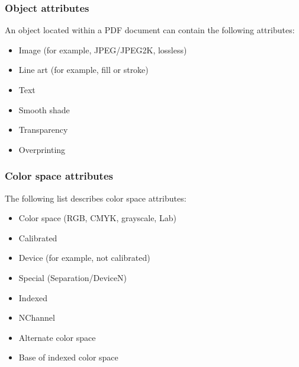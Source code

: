 \documentclass[letterpaper,12pt,english,openany,oneside]{sphinxmanual}
\begin{document}
\subsubsection{Object attributes}
\label{\detokenize{Plugins_ExtendedAPI:object-attributes}}
An object located within a PDF document can contain the following attributes:
\begin{itemize}
\item {} 
Image (for example, JPEG/JPEG2K, lossless)

\item {} 
Line art (for example, fill or stroke)

\item {} 
Text

\item {} 
Smooth shade

\item {} 
Transparency

\item {} 
Overprinting

\end{itemize}


\subsubsection{Color space attributes}
\label{\detokenize{Plugins_ExtendedAPI:color-space-attributes}}
The following list describes color space attributes:
\begin{itemize}
\item {} 
Color space (RGB, CMYK, grayscale, Lab)

\item {} 
Calibrated

\item {} 
Device (for example, not calibrated)

\item {} 
Special (Separation/DeviceN)

\item {} 
Indexed

\item {} 
NChannel

\item {} 
Alternate color space

\item {} 
Base of indexed color space

\end{itemize}
\end{document}
